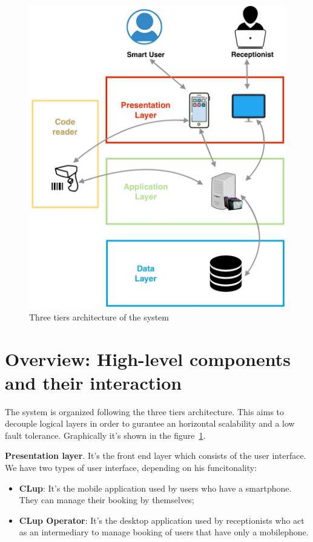 \begin{figure}[H]
  \caption{Three tiers architecture of the system}
  \label{3tiers}
  \centering
  \includegraphics[scale=0.25]{diagrams/3_tiers.jpeg}

\end{figure}


\section{Overview: High-level components and their interaction}
The system is organized following the three tiers architecture. This aims to decouple logical layers in order to gurantee an horizontal scalability and a low fault tolerance.
Graphically it's shown in the figure~\ref{3tiers}.
\par


\textbf{Presentation layer}. It's the front end layer which consists of the user interface. We have two types of user interface, depending on his funcitonality: 
\begin{itemize}
\item \textbf{CLup}: It's the mobile application used by users who have a smartphone. They can manage their booking by themselves;
\item \textbf{CLup Operator}: It's the desktop application used by receptionists who act as an intermediary to manage booking of users that have only a mobilephone.
\end{itemize}

